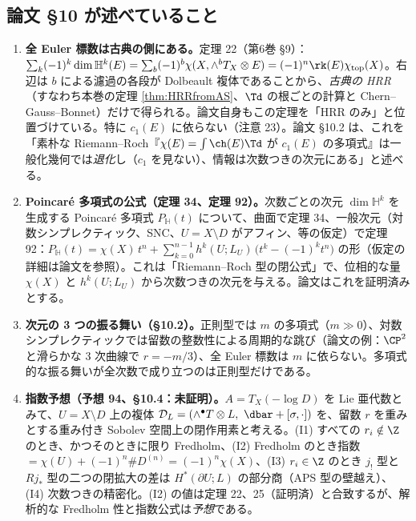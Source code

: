 \subsection{論文 \S10 が述べていること}
\begin{enumerate}
\item \textbf{全 Euler 標数は古典の側にある。}定理 22（第6巻 \S9）：$\sum_k(-1)^k\dim\mathbb H^k(E)=\sum_b(-1)^b\chi(X,\wedge^bT_X\otimes E)=(-1)^n\rk(E)\chi_{\rm top}(X)$。右辺は $b$ による濾過の各段が Dolbeault 複体であることから、\emph{古典の HRR}（すなわち本巻の定理 \ref{thm:HRRfromAS}、$\Td$ の根ごとの計算と Chern--Gauss--Bonnet）だけで得られる。論文自身もこの定理を「HRR のみ」と位置づけている。特に $c_1(E)$ に依らない（注意 23）。論文 \S10.2 は、これを「素朴な Riemann--Roch『$\chi(E)=\int\ch(E)\Td$ が $c_1(E)$ の多項式』は一般化幾何では\emph{退化}し（$c_1$ を見ない）、情報は次数つきの次元にある」と述べる。
\item \textbf{Poincaré 多項式の公式（定理 34、定理 92）。}次数ごとの次元 $\dim\mathbb H^k$ を生成する Poincaré 多項式 $P_{\mathbb H}(t)$ について、曲面で定理 34、一般次元（対数シンプレクティック、SNC、$U=X\setminus D$ がアフィン、等の仮定）で定理 92：$P_{\mathbb H}(t)=\chi(X)\,t^n+\sum_{k=0}^{n-1}h^k(U;L_U)\,\bigl(t^k-(-1)^kt^n\bigr)$ の形（仮定の詳細は論文を参照）。これは「Riemann--Roch 型の閉公式」で、位相的な量 $\chi(X)$ と $h^k(U;L_U)$ から次数つきの次元を与える。論文はこれを証明済みとする。
\item \textbf{次元の 3 つの振る舞い（\S10.2）。}正則型では $m$ の多項式（$m\gg0$）、対数シンプレクティックでは留数の整数性による周期的な跳び（論文の例：$\CP^2$ と滑らかな 3 次曲線で $r=-m/3$）、全 Euler 標数は $m$ に依らない。多項式的な振る舞いが全次数で成り立つのは正則型だけである。
\item \textbf{指数予想（予想 94、\S10.4：未証明）。}$A=T_X(-\log D)$ を Lie 亜代数とみて、$U=X\setminus D$ 上の複体 $\mathcal D_L=(\wedge^\bullet T\otimes L,\ \dbar+[\sigma,\cdot])$ を、留数 $r$ を重みとする重み付き Sobolev 空間上の閉作用素と考える。(I1) すべての $r_i\notin\Z$ のとき、かつそのときに限り Fredholm、(I2) Fredholm のとき指数 $=\chi(U)+(-1)^n\#D^{(n)}=(-1)^n\chi(X)$、(I3) $r_i\in\Z$ のとき $j_!$ 型と $Rj_*$ 型の二つの閉拡大の差は $H^*(\partial U;L)$ の部分商（APS 型の壁越え）、(I4) 次数つきの精密化。(I2) の値は定理 22、25（証明済）と合致するが、解析的な Fredholm 性と指数公式は\emph{予想}である。
\end{enumerate}

